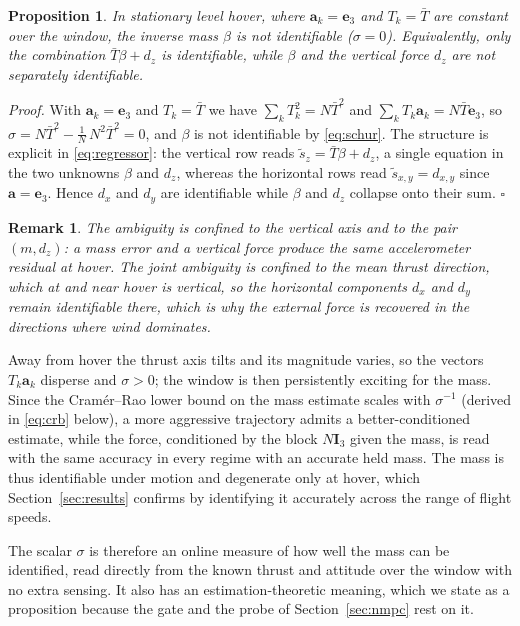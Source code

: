 \documentclass{ieeeaccess}
\newtheorem{proposition}{Proposition}
\newtheorem{remark}{Remark}
\renewenvironment{proof}{\noindent\textit{Proof.}}{\hfill$\square$\medskip}
\newcommand{\vect}[1]{\bm{#1}}
\newcommand{\mat}[1]{\mathbf{#1}}
\begin{document}
\begin{proposition}\label{prop:hover}
In stationary level hover, where $\vect{a}_k=\vect{e}_3$ and $T_k=\bar{T}$ are
constant over the window, the inverse mass $\beta$ is not identifiable
($\sigma=0$). Equivalently, only the combination $\bar{T}\beta+d_z$ is
identifiable, while $\beta$ and the vertical force $d_z$ are not separately
identifiable.
\end{proposition}
\begin{proof}
With $\vect{a}_k=\vect{e}_3$ and $T_k=\bar{T}$ we have $\sum_k T_k^2=N\bar{T}^2$
and $\sum_k T_k\vect{a}_k=N\bar{T}\vect{e}_3$, so
$\sigma = N\bar{T}^2-\tfrac{1}{N}\,N^2\bar{T}^2 = 0$, and $\beta$ is not
identifiable by \eqref{eq:schur}. The structure is explicit in
\eqref{eq:regressor}: the vertical row reads
$\tilde{s}_z=\bar{T}\beta+d_z$, a single equation in the two unknowns
$\beta$ and $d_z$, whereas the horizontal rows read
$\tilde{s}_{x,y}=d_{x,y}$ since $\vect{a}=\vect{e}_3$. Hence $d_x$ and $d_y$ are
identifiable while $\beta$ and $d_z$ collapse onto their sum.
\end{proof}

\begin{remark}
The ambiguity is confined to the vertical axis and to the pair $(m,d_z)$: a
mass error and a vertical force produce the same accelerometer residual at
hover. The joint ambiguity is confined to the mean thrust direction, which at
and near hover is vertical, so the horizontal components $d_x$ and $d_y$ remain
identifiable there, which is why the external force is recovered in the directions
where wind dominates.
\end{remark}

Away from hover the thrust axis tilts and its magnitude varies, so the vectors
$T_k\vect{a}_k$ disperse and $\sigma>0$; the window is then persistently exciting for
the mass. Since the Cram\'er--Rao lower bound on
the mass estimate scales with $\sigma^{-1}$ (derived in \eqref{eq:crb} below), a
more aggressive trajectory admits a better-conditioned estimate, while the force,
conditioned by the block
$N\mat{I}_3$ given the mass, is read with the same accuracy in every regime with
an accurate held mass. The mass is thus
identifiable under motion and degenerate only at hover, which
Section~\ref{sec:results} confirms by identifying it accurately across the range
of flight speeds.

The scalar $\sigma$ is therefore an online measure of how well the mass can be
identified, read directly from the known thrust and attitude over the window with
no extra sensing. It also has an estimation-theoretic meaning, which we state as
a proposition because the gate and the probe of Section~\ref{sec:nmpc} rest on it.
\end{document}
